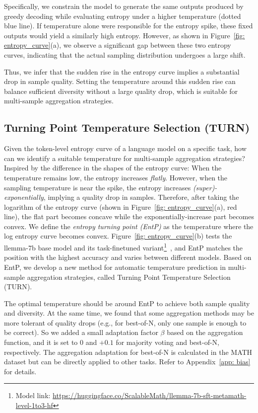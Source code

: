 Specifically, we constrain the model to generate the same outputs produced by greedy decoding while evaluating entropy under a higher temperature (dotted blue
line). If temperature alone were responsible for the entropy spike, these fixed outputs would yield a similarly high entropy. However, as shown in Figure~\ref{fig: entropy_curve}(a), we observe a significant gap between these two entropy curves, indicating that the actual sampling distribution undergoes a large shift.

Thus, we infer that the sudden rise in the entropy curve implies a substantial drop in sample quality. Setting the temperature around this sudden rise can balance sufficient diversity without a large quality drop, which is suitable for multi-sample aggregation strategies.

\subsection{Turning Point Temperature Selection (\textsc{TURN})}
\label{sec: turn}
Given the token-level entropy curve of a language model on a specific task, how can we identify a suitable temperature for multi-sample aggregation strategies? Inspired by the difference in the shapes of the entropy curve: When the temperature remains low, the entropy increases \emph{flatly}. However, when the sampling temperature is near the spike, the entropy increases \emph{(super)-exponentially}, implying a quality drop in samples. Therefore, after taking the logarithm of the entropy curve (shown in Figure~\ref{fig: entropy_curve}(a), red line), the flat part becomes concave while the exponentially-increase part becomes convex. We define the \emph{entropy turning point (EntP)} as the temperature where the log entropy curve becomes convex. Figure~\ref{fig: entropy_curve}(b) tests the llemma-7b base model and its task-finetuned variant\footnote{Model link: \href{https://huggingface.co/ScalableMath/llemma-7b-sft-metamath-level-1to3-hf}{https://huggingface.co/ScalableMath/llemma-7b-sft-metamath-level-1to3-hf}}~\cite{sun2024easy}, and EntP matches the position with the highest accuracy and varies between different models. Based on EntP, we develop a new method for automatic temperature prediction in multi-sample aggregation strategies, called Turning Point Temperature Selection (\textsc{TURN}).

The optimal temperature should be around EntP to achieve both sample quality and diversity. At the same time, we found that some aggregation methods may be more tolerant of quality drops (e.g., for best-of-N, only one sample is enough to be correct). So we added a small adaptation factor $\beta$ based on the aggregation function, and it is set to $0$ and $+0.1$ for majority voting and best-of-N, respectively. The aggregation adaptation for best-of-N is calculated in the MATH dataset but can be directly applied to other tasks. Refer to Appendix~\ref{app: bias} for details.


